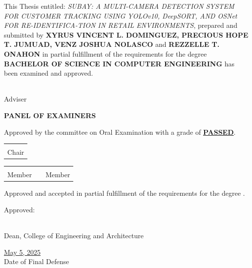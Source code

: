 {\baselineskip
	\small
	\justifying
	
	\noindent This Thesis entitled: \textit{SUBAY: A MULTI-CAMERA DETECTION SYSTEM FOR CUSTOMER TRACKING USING YOLOv10, DeepSORT, AND OSNet FOR RE-IDENTIFICA-\-TION IN RETAIL ENVIRONMENTS}, prepared and submitted by \textbf{XYRUS VINCENT L. DOMINGUEZ, PRECIOUS HOPE T. JUMUAD, VENZ JOSHUA NOLASCO} and \textbf{REZZELLE T. ONAHON} in partial fulfillment of the requirements for the degree \textbf{BACHELOR OF SCIENCE IN COMPUTER ENGINEERING} has been examined and approved.
	
	\vspace{1.5em}
	
	\begin{flushright}
		\underline{\textbf{\adviser}}\\
		Adviser
	\end{flushright}
	
	\vspace{0.5em}
	
	\centerline{\makebox[6in]{\hrulefill}}
	\begin{center}
		\textbf{PANEL OF EXAMINERS}
	\end{center}
	
	\noindent Approved by the committee on Oral Examination with a grade of \textbf{\underline{PASSED}}.
	
	\vspace{2em}
	
	\begin{center}
		\begin{tabular}{c}
			\underline{\textbf{\chair}} \\
			Chair
		\end{tabular}
		
		\vspace{2em}
		
		\begin{tabular}{ccc}
			\underline{\textbf{\panelone}} & \hspace{0.5cm} & \underline{\textbf{\paneltwo}} \\
			Member & & Member
		\end{tabular}
	\end{center}
	
	\vspace{2em}
	
	\noindent Approved and accepted in partial fulfillment of the requirements for the degree \textbf{\program}.
	
	\vspace{30pt}
	
	\noindent Approved:
	
	\vspace{1em}
	
	\begin{flushleft}
		\underline{\textbf{\ceadean}}\\
		Dean, College of Engineering and Architecture
	\end{flushleft}
	
	\begin{flushleft}
		\underline{{May 5, 2025}}\\
		Date of Final Defense
	\end{flushleft}
}